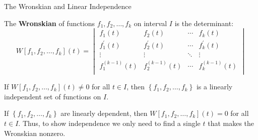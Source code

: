 \documentclass{beamer}
\begin{document}
\begin{frame}{The Wronskian and Linear Independence}
\begin{definition}
The \textbf{Wronskian} of functions $f_1,f_2,\dots,f_k$ on interval $I$ is the determinant:
\begin{equation*}
W[f_1,f_2,\dots,f_k](t)=
\begin{vmatrix}
f_1(t)                & f_2(t)                & \cdots  & f_k(t)                \\
f_1^\prime(t)         & f_2^\prime(t)         & \cdots  & f_k^\prime(t)         \\
\vdots                & \vdots                & \ddots & \vdots                \\
f_1^{(k-1)}(t)        & f_2^{(k-1)}(t)        & \cdots  & f_k^{(k-1)}(t)        \\
\end{vmatrix}
\end{equation*}
\end{definition}\pause
\begin{theorem}
If $W[f_1,f_2,\dots,f_k](t)\neq 0$ for all $t\in I$, then $\left\{f_1,f_2,\dots,f_k\right\}$ is a linearly independent set of functions on $I$.
\end{theorem}\pause
\begin{block}{}
If $\left\{f_1,f_2,\dots,f_k\right\}$ are linearly dependent, then $W[f_1,f_2,\dots,f_k](t)=0$ for all $t\in I$. Thus, to show independence we only need to find a single $t$ that makes the Wronskian nonzero.
\end{block}
\end{frame}
\end{document}

